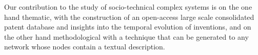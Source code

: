 Our contribution to the study of socio-technical complex systems is on the one hand thematic, with the construction of an open-access large scale consolidated patent database and insights into the temporal evolution of inventions, and on the other hand methodological with a technique that can be generated to any network whose nodes contain a textual description.


\bigskip


\bigskip







%
%



